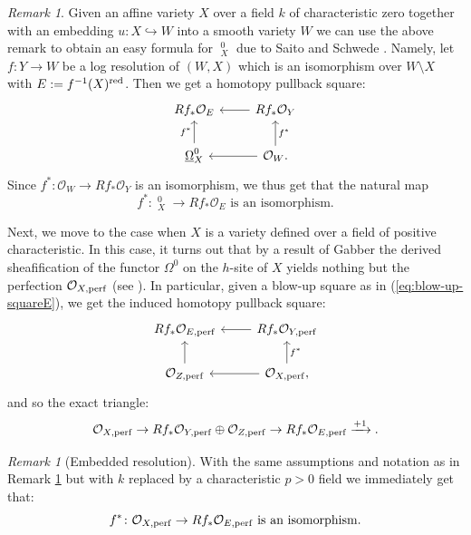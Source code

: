 \documentclass[letterpaper,11pt]{amsart}
\DeclareMathOperator{\DDB}{\underline{\Omega}}
\theoremstyle{plain}
\theoremstyle{definition}
\theoremstyle{remark}
\newtheorem{rmk}[thm]{Remark}
\def\cO{\mathcal{O}}
\begin{document}
\begin{rmk} \label{rmk:SchwedeFormula}
Given an affine variety $X$ over a field $k$ of characteristic zero together with an embedding $u \colon X \hookrightarrow W$ into a smooth variety $W$ we can use the above remark to obtain an easy formula for $\DDB^0_X$ due to Saito and Schwede \cite{SchwedeDB}. Namely, let $f \colon Y \to W$ be a log resolution of $(W,X)$ which is an isomorphism over $W \setminus X$ with $E := f^{-1}(X)^{\rm red}$. Then we get a homotopy pullback square:
\begin{equation*}
\begin{tikzcd}
Rf_*\cO_{E}   & \ar{l} Rf_*\cO_{Y}  \\
\DDB^{0}_{X}  \ar{u}{f^*} & \ar{l}  \ar{u}[swap]{f^*} \cO_W.
\end{tikzcd}
\end{equation*}
Since $f^* \colon \cO_W \to Rf_*\cO_Y$ is an isomorphism, we thus get that the natural map
\begin{equation} \label{eq:Schwede}
f^* \colon \DDB^{0}_{X} \to Rf_*\cO_E \text{ is an isomorphism.}
\end{equation}
\end{rmk}
\vspace{1em}
Next, we move to the case when $X$ is a variety defined over a field of positive characteristic. In this case, it turns out that by a result of Gabber the derived sheafification of the functor $\Omega^0$ on the $h$-site of $X$ yields nothing but the perfection $\cO_{X, {\rm perf}}$ (see \cite[Theorem 3.3]{BST}). In particular, given a blow-up square as in (\ref{eq:blow-up-squareE}), we get the induced homotopy pullback square:
\begin{equation} \label{eq:HPSPerf}
\begin{tikzcd}
Rf_*\cO_{E, {\rm perf}}   & \ar{l} Rf_*\cO_{Y, {\rm perf}}   \\
\cO_{Z, {\rm perf}}   \ar{u} & \ar{l}  \ar{u}[swap]{f^*} \cO_{X, {\rm perf}} ,
\end{tikzcd}
\end{equation}
and so the exact triangle:
\begin{equation} \label{eq:exact-triangle-Eperf}
\cO_{X, {\rm perf}}  \to Rf_*\cO_{Y, {\rm perf}}  \oplus \cO_{Z, {\rm perf}}  \to  Rf_*\cO_{E, {\rm perf}}  \xrightarrow{+1}.
\end{equation}
\begin{rmk}[Embedded resolution]
With the same assumptions and notation as in Remark \ref{rmk:SchwedeFormula} but with $k$ replaced by a characteristic $p>0$ field we immediately get that:
\begin{equation} \label{eq:SchwedeCharP}
f^* \colon \cO_{X,{\rm perf}} \to Rf_*\cO_{E, {\rm perf}} \text{ is an isomorphism.}
\end{equation}
\end{rmk}
\end{document}
